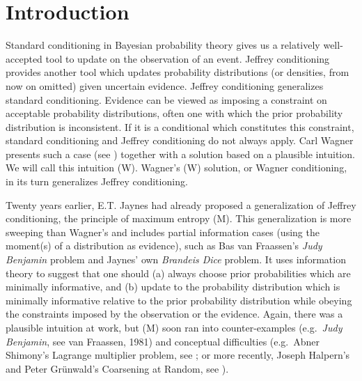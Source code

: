 \section{Introduction}
\label{pintroduction}

Standard conditioning in Bayesian probability theory gives us a
relatively well-accepted tool to update on the observation of an
event. Jeffrey conditioning provides another tool which updates
probability distributions (or densities, from now on omitted) given
uncertain evidence. Jeffrey conditioning generalizes standard
conditioning. Evidence can be viewed as imposing a constraint on
acceptable probability distributions, often one with which the prior
probability distribution is inconsistent. If it is a conditional which
constitutes this constraint, standard conditioning and Jeffrey
conditioning do not always apply. Carl Wagner presents such a case
(see ) together with a solution based on a
plausible intuition. We will call this intuition (W). Wagner's (W)
solution, or Wagner conditioning, in its turn generalizes Jeffrey
conditioning.

Twenty years earlier, E.T. Jaynes had already proposed a
generalization of Jeffrey conditioning, the principle of maximum
entropy (M). This generalization is more sweeping than Wagner's and
includes partial information cases (using the moment(s) of a
distribution as evidence), such as Bas van Fraassen's \emph{Judy
  Benjamin} problem and Jaynes' own \emph{Brandeis Dice} problem. It
uses information theory to suggest that one should (a) always choose
prior probabilities which are minimally informative, and (b) update to
the probability distribution which is minimally informative relative
to the prior probability distribution while obeying the constraints
imposed by the observation or the evidence. Again, there was a
plausible intuition at work, but (M) soon ran into counter-examples
(e.g.\ \emph{Judy Benjamin}, see van Fraassen, 1981) and conceptual
difficulties (e.g.\ Abner Shimony's Lagrange multiplier problem, see
; or more recently, Joseph Halpern's and
Peter Gr{\"u}nwald's Coarsening at Random, see
).

